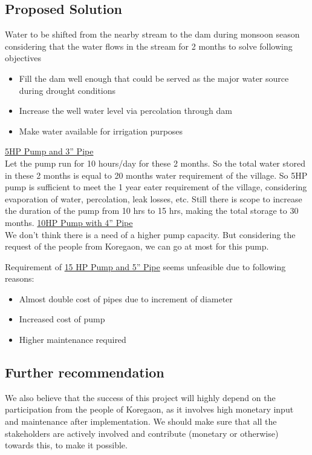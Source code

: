 \documentclass{article}
\begin{document}
\subsection{Proposed Solution}
Water to be shifted from the nearby stream to the dam during monsoon season considering
that the water flows in the stream for 2 months to solve following objectives
\begin{itemize}
\item Fill the dam well enough that could be served as the major water source during drought conditions
\item Increase the well water level via percolation through dam
\item Make water available for irrigation purposes
\end{itemize}
\underline{5HP Pump and 3'' Pipe}\\
Let the pump run for 10 hours/day for these 2 months. So the total water stored in these 2 months is equal to 20 months water requirement of the village. So 5HP pump is sufficient to meet the 1 year eater requirement of the village, considering evaporation of water, percolation, leak losses, etc. Still there is scope to increase the duration of the pump from 10 hrs to 15 hrs, making the total storage to 30 months.
\underline{10HP Pump with 4'' Pipe}\\
We don't think there is a need of a higher pump capacity. But considering the request of the people from Koregaon, we can go at most for this pump.

Requirement of \underline{15 HP Pump and 5'' Pipe} seems unfeasible due to following reasons:
\begin{itemize}
\item Almost double cost of pipes due to increment of diameter
\item Increased cost of pump
\item Higher maintenance required
\end{itemize}

\subsection{Further recommendation}
We also believe that the success of this project will highly
depend on the participation from the people of Koregaon, as it involves high monetary input and maintenance after implementation. We should make sure that all the stakeholders are actively involved and contribute (monetary or otherwise) towards this, to make it possible.
\end{document}
